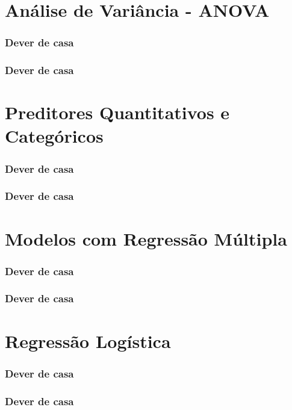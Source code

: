 \documentclass[graphics,14pt]{beamer}
\begin{document}
\section{Análise de Variância - ANOVA}
\begin{frame}[t,fragile=singleslide]
\frametitle{Dever de casa}
\end{frame}
\begin{frame}[t,fragile=singleslide]
\frametitle{Dever de casa}
\end{frame}
\section{Preditores Quantitativos e Categóricos}
\begin{frame}[t,fragile=singleslide]
\frametitle{Dever de casa}
\end{frame}
\begin{frame}[t,fragile=singleslide]
\frametitle{Dever de casa}
\end{frame}
\section{Modelos com Regressão Múltipla}
\begin{frame}[t,fragile=singleslide]
\frametitle{Dever de casa}
\end{frame}
\begin{frame}[t,fragile=singleslide]
\frametitle{Dever de casa}
\end{frame}
\section{Regressão Logística}
\begin{frame}[t,fragile=singleslide]
\frametitle{Dever de casa}
\end{frame}
\begin{frame}[t,fragile=singleslide]
\frametitle{Dever de casa}
\end{frame}
\end{document}

